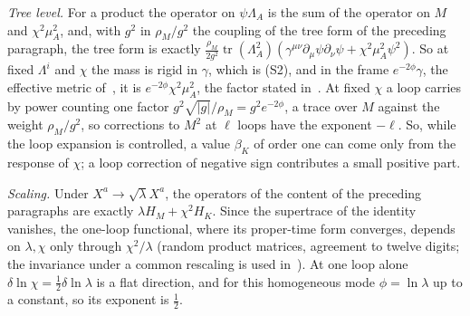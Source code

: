\emph{Tree level.} For a product the operator on \(\psi\Lambda_A\) is the sum of the operator on \(M\) and \(\chi^2\mu_A^2\), and, with \(g^2\) in \(\rho_M/g^2\) the coupling of the tree form of the preceding paragraph, the tree form is exactly \(\tfrac{\rho_M}{2g^2}\operatorname{tr}(\Lambda_A^2)(\gamma^{\mu\nu}\partial_\mu\psi\partial_\nu\psi+\chi^2\mu_A^2\psi^2)\). So at fixed \(\Lambda^i\) and \(\chi\) the mass is rigid in \(\gamma\), which is (S2), and in the frame \(e^{-2\phi}\gamma\), the effective metric of~\cite{Steinacker2026}, it is \(e^{-2\phi}\chi^2\mu_A^2\), the factor stated in~\cite{MantaSteinacker2025b}. At fixed \(\chi\) a loop carries by power counting one factor \(g^2\sqrt{|g|}/\rho_M=g^2e^{-2\phi}\), a trace over \(M\) against the weight \(\rho_M/g^2\), so corrections to \(M^2\) at \(\ell\) loops have the exponent \(-\ell\). So, while the loop expansion is controlled, a value \(\beta_K\) of order one can come only from the response of \(\chi\); a loop correction of negative sign contributes a small positive part.

\emph{Scaling.} Under \(X^a\to\sqrt\lambda X^a\), the operators of the content of the preceding paragraphs are exactly \(\lambda H_M+\chi^2H_K\). Since the supertrace of the identity vanishes, the one-loop functional, where its proper-time form converges, depends on \(\lambda,\chi\) only through \(\chi^2/\lambda\) (random product matrices, agreement to twelve digits; the invariance under a common rescaling is used in~\cite{MantaSteinacker2025b}). At one loop alone \(\delta\ln\chi=\tfrac12\delta\ln\lambda\) is a flat direction, and for this homogeneous mode \(\phi=\ln\lambda\) up to a constant, so its exponent is \(\tfrac12\).

